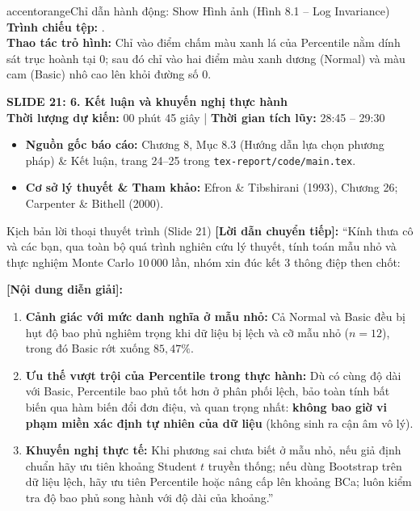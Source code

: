 \documentclass[10pt,a4paper]{article}
\newcommand{\slideheader}[4]{
    \vspace{0.4cm}
    \begin{tcolorbox}[colback=primary!7!white, colframe=primary, arc=2mm, boxrule=1pt, left=4mm, right=4mm, top=2.5mm, bottom=2.5mm]
        {\Large\bfseries\color{primary} SLIDE #1: #2}\\[0.1cm]
        {\small\textbf{Thời lượng dự kiến:} #3 \quad | \quad \textbf{Thời gian tích lũy:} #4}
    \end{tcolorbox}
    \vspace{0.15cm}
}
\begin{document}
\begin{actionbox}{accentorange}{Chỉ dẫn hành động: Show Hình ảnh (Hình 8.1 -- Log Invariance)}
    \textbf{Trình chiếu tệp:} .\\
    \textbf{Thao tác trỏ hình:} Chỉ vào điểm chấm màu xanh lá của Percentile nằm dính sát trục hoành tại $0$; sau đó chỉ vào hai điểm màu xanh dương (Normal) và màu cam (Basic) nhô cao lên khỏi đường số 0.
\end{actionbox}

\slideheader{21}{6. Kết luận và khuyến nghị thực hành}{00 phút 45 giây}{28:45 -- 29:30}

\begin{itemize}
    \item \textbf{Nguồn gốc báo cáo:} Chương 8, Mục 8.3 (Hướng dẫn lựa chọn phương pháp) \& Kết luận, trang 24--25 trong \texttt{tex-report/code/main.tex}.
    \item \textbf{Cơ sở lý thuyết \& Tham khảo:} Efron \& Tibshirani (1993), Chương 26; Carpenter \& Bithell (2000).
\end{itemize}

\begin{scriptbox}{Kịch bản lời thoại thuyết trình (Slide 21)}
    \textbf{[Lời dẫn chuyển tiếp]:} ``Kính thưa cô và các bạn, qua toàn bộ quá trình nghiên cứu lý thuyết, tính toán mẫu nhỏ và thực nghiệm Monte Carlo $10\,000$ lần, nhóm xin đúc kết 3 thông điệp then chốt:
    
    \textbf{[Nội dung diễn giải]:} 
    \begin{enumerate}
        \item \textbf{Cảnh giác với mức danh nghĩa ở mẫu nhỏ:} Cả Normal và Basic đều bị hụt độ bao phủ nghiêm trọng khi dữ liệu bị lệch và cỡ mẫu nhỏ ($n=12$), trong đó Basic rớt xuống $85{,}47\%$.
        \item \textbf{Ưu thế vượt trội của Percentile trong thực hành:} Dù có cùng độ dài với Basic, Percentile bao phủ tốt hơn ở phân phối lệch, bảo toàn tính bất biến qua hàm biến đổi đơn điệu, và quan trọng nhất: \textbf{không bao giờ vi phạm miền xác định tự nhiên của dữ liệu} (không sinh ra cận âm vô lý).
        \item \textbf{Khuyến nghị thực tế:} Khi phương sai chưa biết ở mẫu nhỏ, nếu giả định chuẩn hãy ưu tiên khoảng Student $t$ truyền thống; nếu dùng Bootstrap trên dữ liệu lệch, hãy ưu tiên Percentile hoặc nâng cấp lên khoảng BCa; luôn kiểm tra độ bao phủ song hành với độ dài của khoảng.''
    \end{enumerate}
\end{scriptbox}
\end{document}
